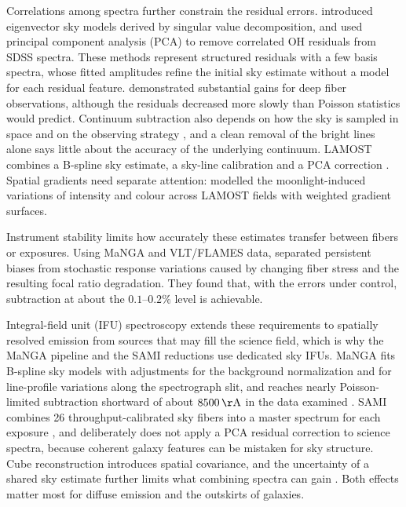 Correlations among spectra further constrain the residual errors.
\citet{Kurtz2000} introduced eigenvector sky models derived by singular value
decomposition, and \citet{Wild2005} used principal component analysis (PCA)
to remove correlated OH residuals from SDSS spectra. These methods represent
structured residuals with a few basis spectra, whose fitted amplitudes refine
the initial sky estimate without a model for each residual feature.
\citet{Sharp2010} demonstrated substantial gains for deep fiber
observations, although the residuals decreased more slowly than Poisson
statistics would predict. Continuum subtraction also depends on how the sky
is sampled in space and on the observing strategy \citep{Yang2013}, and a
clean removal of the bright lines alone says little about the accuracy of the
underlying continuum. LAMOST combines a B-spline sky estimate, a sky-line
calibration and a PCA correction \citep{Bai2017}. Spatial gradients need
separate attention: \citet{Han2023} modelled the moonlight-induced variations
of intensity and colour across LAMOST fields with weighted gradient surfaces.

Instrument stability limits how accurately these estimates transfer between
fibers or exposures. Using MaNGA and VLT/FLAMES data, \citet{Bundy2022}
separated persistent biases from stochastic response variations caused by
changing fiber stress and the resulting focal ratio degradation. They found
that, with the errors under control, subtraction at about the
$0.1$--$0.2\%$ level is achievable.

Integral-field unit (IFU) spectroscopy extends these requirements to
spatially resolved emission from sources that may fill the science field,
which is why the MaNGA pipeline \citep{Law2016} and the SAMI reductions
\citep{Sharp2010,Sharp2015} use dedicated sky IFUs. MaNGA fits B-spline sky
models with adjustments for the background normalization and for
line-profile variations along the spectrograph slit, and reaches nearly
Poisson-limited subtraction shortward of about $8500\,\mathrm{\AA}$ in the
data examined \citep{Law2016}. SAMI combines 26 throughput-calibrated sky
fibers into a master spectrum for each exposure \citep{Sharp2015}, and
deliberately does not apply a PCA residual correction to science spectra,
because coherent galaxy features can be mistaken for sky structure. Cube
reconstruction introduces spatial covariance, and the uncertainty of a shared
sky estimate further limits what combining spectra can gain
\citep{Sharp2015,Law2016}. Both effects matter most for diffuse emission and
the outskirts of galaxies.

